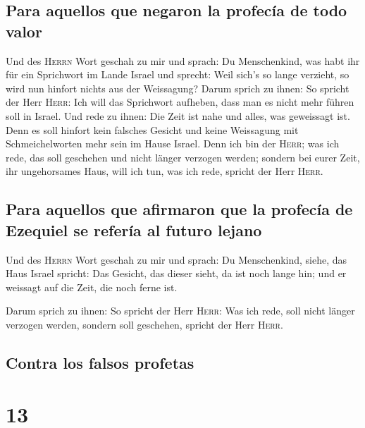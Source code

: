 \hypertarget{para-aquellos-que-negaron-la-profecuxeda-de-todo-valor}{%
\subsection{Para aquellos que negaron la profecía de todo
valor}\label{para-aquellos-que-negaron-la-profecuxeda-de-todo-valor}}

 Und des \textsc{Herrn} Wort geschah zu mir und sprach:
 Du Menschenkind, was habt ihr für ein Sprichwort im
Lande Israel und sprecht: Weil sich's so lange verzieht, so wird nun
hinfort nichts aus der Weissagung?  Darum sprich zu
ihnen: So spricht der Herr \textsc{Herr}: Ich will das Sprichwort
aufheben, dass man es nicht mehr führen soll in Israel. Und rede zu
ihnen: Die Zeit ist nahe und alles, was geweissagt ist. 
Denn es soll hinfort kein falsches Gesicht und keine Weissagung mit
Schmeichelworten mehr sein im Hause Israel.  Denn ich bin
der \textsc{Herr}; was ich rede, das soll geschehen und nicht länger
verzogen werden; sondern bei eurer Zeit, ihr ungehorsames Haus, will ich
tun, was ich rede, spricht der Herr \textsc{Herr}.

\hypertarget{para-aquellos-que-afirmaron-que-la-profecuxeda-de-ezequiel-se-referuxeda-al-futuro-lejano}{%
\subsection{Para aquellos que afirmaron que la profecía de Ezequiel se
refería al futuro
lejano}\label{para-aquellos-que-afirmaron-que-la-profecuxeda-de-ezequiel-se-referuxeda-al-futuro-lejano}}

 Und des \textsc{Herrn} Wort geschah zu mir und sprach:
 Du Menschenkind, siehe, das Haus Israel spricht: Das
Gesicht, das dieser sieht, da ist noch lange hin; und er weissagt auf
die Zeit, die noch ferne ist.

 Darum sprich zu ihnen: So spricht der Herr
\textsc{Herr}: Was ich rede, soll nicht länger verzogen werden, sondern
soll geschehen, spricht der Herr \textsc{Herr}.

\hypertarget{contra-los-falsos-profetas}{%
\subsection{Contra los falsos
profetas}\label{contra-los-falsos-profetas}}

\hypertarget{section-12}{%
\section{13}\label{section-12}}


